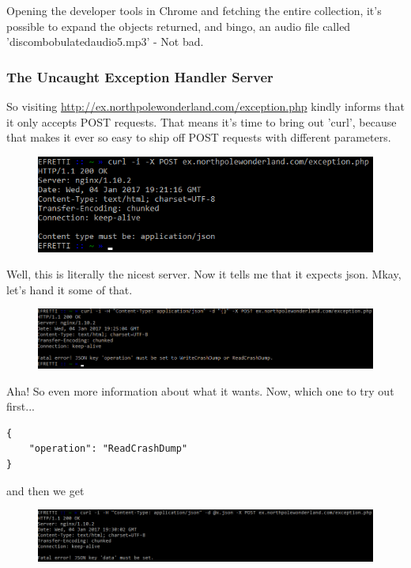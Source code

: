 \documentclass[writeup.tex]{subfiles}
\begin{document}
			Opening the developer tools in Chrome and fetching the entire collection, it's possible to expand the objects returned, and bingo, an audio file called 'discombobulatedaudio5.mp3' - Not bad.
			
		\subsubsection{The Uncaught Exception Handler Server}
			So visiting \url{http://ex.northpolewonderland.com/exception.php} kindly informs that it only accepts POST requests. That means it's time to bring out 'curl', because that makes it ever so easy to ship off POST requests with different parameters.
			
			\begin{figure}[H]
				\centering
				\includegraphics[width=\linewidth]{"screenshots/pwns/Site 5 - curl 1"}
			\end{figure}	
			
			Well, this is literally the nicest server. Now it tells me that it expects json. Mkay, let's hand it some of that.
			
			\begin{figure}[H]
				\centering
				\includegraphics[width=\linewidth]{"screenshots/pwns/Site 5 - curl 2"}
			\end{figure}
			
			Aha! So even more information about what it wants. Now, which one to try out first...
			\begin{lstlisting}[columns=fullflexible,breaklines]
{
	"operation": "ReadCrashDump"
}
			\end{lstlisting}
			
			and then we get
			
			\begin{figure}[H]
				\centering
				\includegraphics[width=\linewidth]{"screenshots/pwns/Site 5 - curl 3"}
			\end{figure}
			
\end{document}
